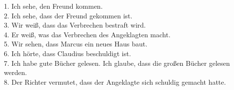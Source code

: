 \documentclass[a4paper]{article}
\begin{document}
1. Ich sehe, den Freund kommen. \\
2. Ich sehe, dass der Freund gekommen ist. \\
3. Wir weiß, dass das Verbrechen bestraft wird. \\
4. Er weiß, was das Verbrechen des Angeklagten macht. \\
5. Wir sehen, dass Marcus ein neues Haus baut. \\
6. Ich hörte, dass Claudius beschuldigt ist. \\
7. Ich habe gute Bücher gelesen. Ich glaube, dass die großen Bücher gelesen werden. \\
8. Der Richter vermutet, dass der Angeklagte sich schuldig gemacht hatte.
\end{document}
